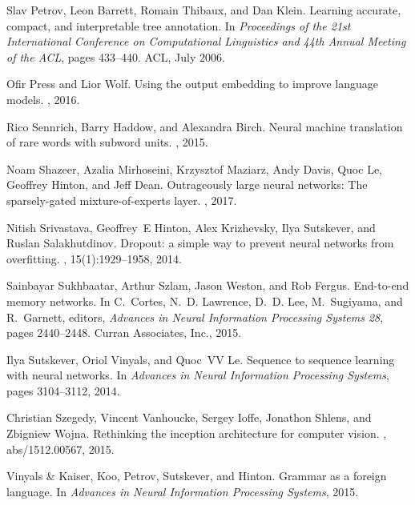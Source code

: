 \documentclass{article}
\begin{document}
\begin{thebibliography}{10}
  Slav Petrov, Leon Barrett, Romain Thibaux, and Dan Klein.
  \newblock Learning accurate, compact, and interpretable tree annotation.
  \newblock In {\em Proceedings of the 21st International Conference on
      Computational Linguistics and 44th Annual Meeting of the ACL}, pages
  433--440. ACL, July 2006.

  Ofir Press and Lior Wolf.
  \newblock Using the output embedding to improve language models.
  , 2016.

  Rico Sennrich, Barry Haddow, and Alexandra Birch.
  \newblock Neural machine translation of rare words with subword units.
  , 2015.

  Noam Shazeer, Azalia Mirhoseini, Krzysztof Maziarz, Andy Davis, Quoc Le,
  Geoffrey Hinton, and Jeff Dean.
  \newblock Outrageously large neural networks: The sparsely-gated
  mixture-of-experts layer.
  , 2017.

  Nitish Srivastava, Geoffrey~E Hinton, Alex Krizhevsky, Ilya Sutskever, and
  Ruslan Salakhutdinov.
  \newblock Dropout: a simple way to prevent neural networks from overfitting.
  , 15(1):1929--1958, 2014.

  Sainbayar Sukhbaatar, Arthur Szlam, Jason Weston, and Rob Fergus.
  \newblock End-to-end memory networks.
  \newblock In C.~Cortes, N.~D. Lawrence, D.~D. Lee, M.~Sugiyama, and
  R.~Garnett,
  editors, {\em Advances in Neural Information Processing Systems 28}, pages
  2440--2448. Curran Associates, Inc., 2015.

  Ilya Sutskever, Oriol Vinyals, and Quoc~VV Le.
  \newblock Sequence to sequence learning with neural networks.
  \newblock In {\em Advances in Neural Information Processing Systems}, pages
  3104--3112, 2014.

  Christian Szegedy, Vincent Vanhoucke, Sergey Ioffe, Jonathon Shlens, and
  Zbigniew Wojna.
  \newblock Rethinking the inception architecture for computer vision.
  , abs/1512.00567, 2015.

  {Vinyals {\&} Kaiser}, Koo, Petrov, Sutskever, and Hinton.
  \newblock Grammar as a foreign language.
  \newblock In {\em Advances in Neural Information Processing Systems}, 2015.


\end{thebibliography}
\end{document}
